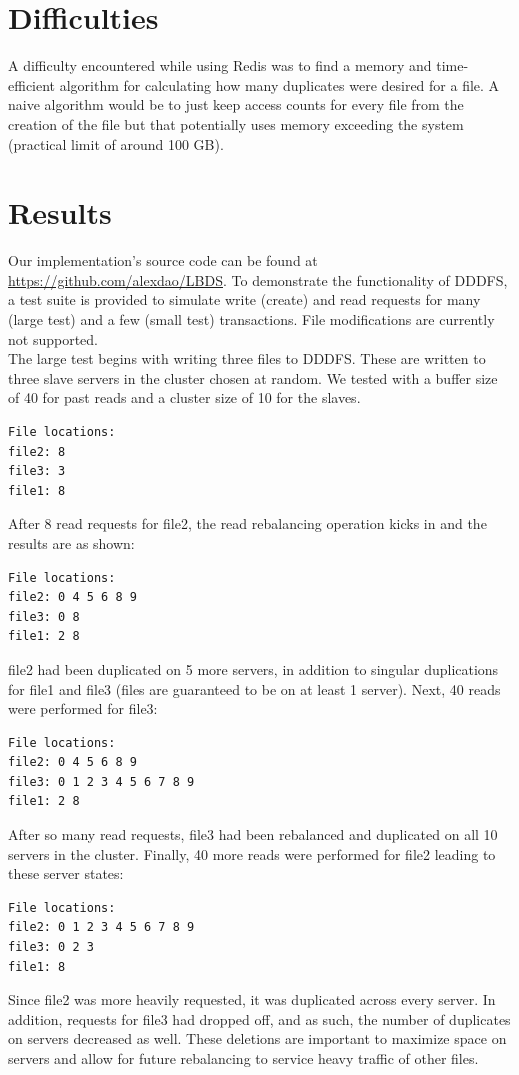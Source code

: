 \documentclass[twoside]{article}
\begin{document}
\begin{multicols}{2}
\section{Difficulties}
A difficulty encountered while using Redis was to find a memory and time-efficient algorithm for calculating how many duplicates were desired for a file. A naive algorithm would be to just keep access counts for every file from the creation of the file but that potentially uses memory exceeding the system (practical limit of around 100 GB).


\section{Results}
Our implementation's source code can be found at \href{https://github.com/alexdao/LBDS}{https://github.com/alexdao/LBDS}. To demonstrate the functionality of DDDFS, a test suite is provided to simulate write (create) and read requests for many (large test) and a few (small test) transactions. File modifications are currently not supported. \\\indent
The large test begins with writing three files to DDDFS. These are written to three slave servers in the cluster chosen at random. We tested with a buffer size of 40 for past reads and a cluster size of 10 for the slaves.
\begin{verbatim}
File locations:
file2: 8
file3: 3
file1: 8
\end{verbatim}
After 8 read requests for file2, the read rebalancing operation kicks in and the results are as shown:
\begin{verbatim}
File locations:
file2: 0 4 5 6 8 9
file3: 0 8
file1: 2 8
\end{verbatim}
file2 had been duplicated on 5 more servers, in addition to singular duplications for file1 and file3 (files are guaranteed to be on at least 1 server). Next, 40 reads were performed for file3:
\begin{verbatim}
File locations:
file2: 0 4 5 6 8 9
file3: 0 1 2 3 4 5 6 7 8 9
file1: 2 8
\end{verbatim}
After so many read requests, file3 had been rebalanced and duplicated on all 10 servers in the cluster. Finally, 40 more reads were performed for file2 leading to these server states:
\begin{verbatim}
File locations:
file2: 0 1 2 3 4 5 6 7 8 9
file3: 0 2 3
file1: 8
\end{verbatim}
Since file2 was more heavily requested, it was duplicated across every server. In addition, requests for file3 had dropped off, and as such, the number of duplicates on servers decreased as well. These deletions are important to maximize space on servers and allow for future rebalancing to service heavy traffic of other files.

\end{multicols}
\end{document}
